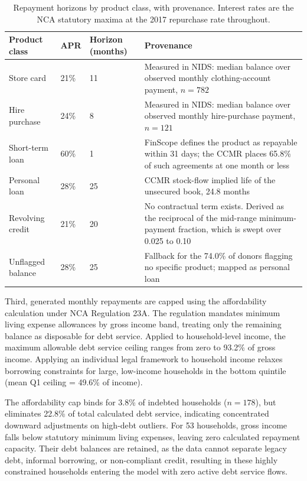 \begin{table}[H]
\centering
\caption{Repayment horizons by product class, with provenance. Interest rates are the \ac{NCA} statutory maxima at the 2017 repurchase rate throughout.}
\label{tab:credit-terms}
\begin{tabular}{L{2.7cm}L{1.2cm}L{1.9cm}L{5.7cm}}
\toprule
\textbf{Product class} & \textbf{\ac{APR}} & \textbf{Horizon (months)} & \textbf{Provenance} \\
\midrule
Store card & 21\% & 11 & Measured in \ac{NIDS}: median balance over observed monthly clothing-account payment, $n=782$ \cite{nids_w5_2018} \\
\addlinespace
Hire purchase & 24\% & 8 & Measured in \ac{NIDS}: median balance over observed monthly hire-purchase payment, $n=121$ \cite{nids_w5_2018} \\
\addlinespace
Short-term loan & 60\% & 1 & \ac{FinScope} defines the product as repayable within 31 days; the \ac{CCMR} places 65.8\% of such agreements at one month or less \cite{finscope2019, ncr_ccmr_2017} \\
\addlinespace
Personal loan & 28\% & 25 & \ac{CCMR} stock-flow implied life of the unsecured book, 24.8 months \cite{ncr_ccmr_2017} \\
\addlinespace
Revolving credit & 21\% & 20 & No contractual term exists. Derived as the reciprocal of the mid-range minimum-payment fraction, which is swept over 0.025 to 0.10 \\
\addlinespace
Unflagged balance & 28\% & 25 & Fallback for the 74.0\% of donors flagging no specific product; mapped as personal loan \\
\bottomrule
\end{tabular}
\end{table}

Third, generated monthly repayments are capped using the affordability calculation under \ac{NCA} Regulation 23A.
The regulation mandates minimum living expense allowances by gross income band, treating only the remaining balance as disposable for debt service.
Applied to household-level income, the maximum allowable debt service ceiling ranges from zero to 93.2\% of gross income.
Applying an individual legal framework to household income relaxes borrowing constraints for large, low-income households in the bottom quintile (mean Q1 ceiling = 49.6\% of income).

The affordability cap binds for 3.8\% of indebted households ($n = 178$), but eliminates 22.8\% of total calculated debt service, indicating concentrated downward adjustments on high-debt outliers.
For 53 households, gross income falls below statutory minimum living expenses, leaving zero calculated repayment capacity.
Their debt balances are retained, as the data cannot separate legacy debt, informal borrowing, or non-compliant credit, resulting in these highly constrained households entering the model with zero active debt service flows.

